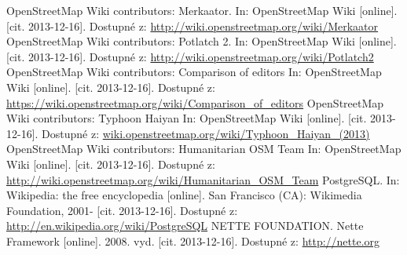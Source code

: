 \documentclass[11pt,a4paper,titlepage,oneside]{book}
\begin{document}
\begin{thebibliography}{50}
	OpenStreetMap Wiki contributors: Merkaator. In: OpenStreetMap Wiki [online]. [cit. 2013-12-16]. Dostupné z:  \url{http://wiki.openstreetmap.org/wiki/Merkaator}
	OpenStreetMap Wiki contributors: Potlatch 2. In: OpenStreetMap Wiki [online]. [cit. 2013-12-16]. Dostupné z:  \url{http://wiki.openstreetmap.org/wiki/Potlatch2}
	OpenStreetMap Wiki contributors: Comparison of editors In: OpenStreetMap Wiki [online]. [cit. 2013-12-16]. Dostupné z:	\url{https://wiki.openstreetmap.org/wiki/Comparison_of_editors}
	OpenStreetMap Wiki contributors: Typhoon Haiyan In: OpenStreetMap Wiki [online]. [cit. 2013-12-16]. Dostupné z: \url{wiki.openstreetmap.org/wiki/Typhoon_Haiyan_(2013)}
	OpenStreetMap Wiki contributors: Humanitarian OSM Team  In: OpenStreetMap Wiki [online]. [cit. 2013-12-16]. Dostupné z: \url{http://wiki.openstreetmap.org/wiki/Humanitarian_OSM_Team}
	PostgreSQL. In: Wikipedia: the free encyclopedia [online]. San Francisco (CA): Wikimedia Foundation, 2001- [cit. 2013-12-16]. Dostupné z: \url{http://en.wikipedia.org/wiki/PostgreSQL}
	NETTE FOUNDATION. Nette Framework [online]. 2008. vyd. [cit. 2013-12-16]. Dostupné z: \url{http://nette.org} 

\end{thebibliography}
\end{document}
